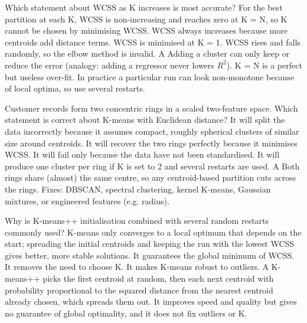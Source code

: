 {Which statement about WCSS as K increases is most accurate?}
{For the best partition at each K, WCSS is non-increasing and reaches zero at K = N, so K cannot be chosen by minimising WCSS.}
{WCSS always increases because more centroids add distance terms.}
{WCSS is minimised at K = 1.}
{WCSS rises and falls randomly, so the elbow method is invalid.}
{A}
{Adding a cluster can only keep or reduce the error (analogy: adding a regressor never lowers $R^2$). K = N is a perfect but useless over-fit. In practice a particular run can look non-monotone because of local optima, so use several restarts.}

{Customer records form two concentric rings in a scaled two-feature space. Which statement is correct about K-means with Euclidean distance?}
{It will split the data incorrectly because it assumes compact, roughly spherical clusters of similar size around centroids.}
{It will recover the two rings perfectly because it minimises WCSS.}
{It will fail only because the data have not been standardised.}
{It will produce one cluster per ring if K is set to 2 and several restarts are used.}
{A}
{Both rings share (almost) the same centre, so any centroid-based partition cuts across the rings. Fixes: DBSCAN, spectral clustering, kernel K-means, Gaussian mixtures, or engineered features (e.g. radius).}

{Why is K-means++ initialisation combined with several random restarts commonly used?}
{K-means only converges to a local optimum that depends on the start; spreading the initial centroids and keeping the run with the lowest WCSS gives better, more stable solutions.}
{It guarantees the global minimum of WCSS.}
{It removes the need to choose K.}
{It makes K-means robust to outliers.}
{A}
{K-means++ picks the first centroid at random, then each next centroid with probability proportional to the squared distance from the nearest centroid already chosen, which spreads them out. It improves speed and quality but gives no guarantee of global optimality, and it does not fix outliers or K.}

